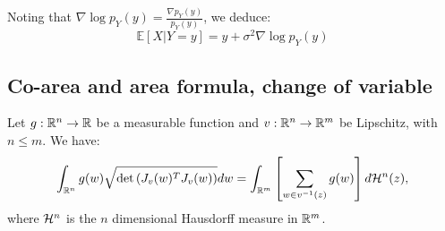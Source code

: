 \documentclass[a4paper,10pt]{article}
\begin{document}
Noting that $\nabla \log p_Y(y) = \frac{\nabla p_Y(y)}{p_Y(y)}$, we deduce:
\begin{equation*}
\mathbb{E}[X | Y = y] = y + \sigma^2 \nabla \log p_Y(y)
\end{equation*}

\subsection{Co-area and area formula, change of variable}
\begin{theorem}
    \label{theorem:area}
    Let $g: \mathbb{R}^n \to \mathbb{R}$ be a measurable function and $v: \mathbb{R}^n \to \mathbb{R}^m$ be Lipschitz, with $n \leqslant m$. We have: 
    \begin{equation*}
        \int_{\mathbb{R}^n} g(w) \sqrt{\mathrm{det}\left( J_v(w)^T J_v(w) \right)} dw = \int_{\mathbb{R}^m} \left[ \sum_{w \in v^{-1}(z)} g(w) \right] d\mathcal{H}^{n}(z),
    \end{equation*}
    where $\mathcal{H}^{n}$ is the $n$ dimensional Hausdorff measure in $\mathbb{R}^m$. 
\end{theorem}
\end{document}
